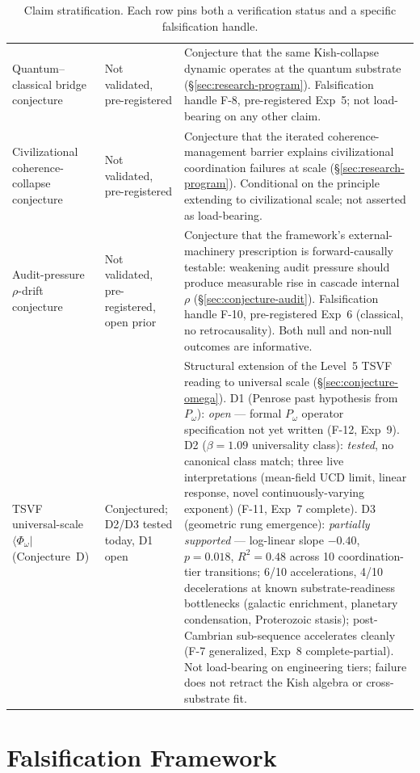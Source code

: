 \documentclass[11pt,a4paper]{article}
\begin{document}
\begin{table}[h]
\begin{tabular}{p{4.5cm}p{3.5cm}p{6.5cm}}
Quantum--classical bridge conjecture & Not validated, pre-registered & Conjecture that the same Kish-collapse dynamic operates at the quantum substrate (\S\ref{sec:research-program}). Falsification handle F-8, pre-registered Exp~5; not load-bearing on any other claim. \\
Civilizational coherence-collapse conjecture & Not validated, pre-registered & Conjecture that the iterated coherence-management barrier explains civilizational coordination failures at scale (\S\ref{sec:research-program}). Conditional on the principle extending to civilizational scale; not asserted as load-bearing. \\
Audit-pressure $\rho$-drift conjecture & Not validated, pre-registered, open prior & Conjecture that the framework's external-machinery prescription is forward-causally testable: weakening audit pressure should produce measurable rise in cascade internal $\rho$ (\S\ref{sec:conjecture-audit}). Falsification handle F-10, pre-registered Exp~6 (classical, no retrocausality). Both null and non-null outcomes are informative. \\
TSVF universal-scale $\langle\Phi_\omega|$ (Conjecture~D) & Conjectured; D2/D3 tested today, D1 open & Structural extension of the Level~5 TSVF reading to universal scale (\S\ref{sec:conjecture-omega}). D1 (Penrose past hypothesis from $P_\omega$): \emph{open} --- formal $P_\omega$ operator specification not yet written (F-12, Exp~9). D2 ($\beta = 1.09$ universality class): \emph{tested}, no canonical class match; three live interpretations (mean-field UCD limit, linear response, novel continuously-varying exponent) (F-11, Exp~7 complete). D3 (geometric rung emergence): \emph{partially supported} — log-linear slope $-0.40$, $p = 0.018$, $R^2 = 0.48$ across 10 coordination-tier transitions; 6/10 accelerations, 4/10 decelerations at known substrate-readiness bottlenecks (galactic enrichment, planetary condensation, Proterozoic stasis); post-Cambrian sub-sequence accelerates cleanly (F-7 generalized, Exp~8 complete-partial). Not load-bearing on engineering tiers; failure does not retract the Kish algebra or cross-substrate fit. \\
\bottomrule
\end{tabular}
\caption{Claim stratification. Each row pins both a verification status and a specific falsification handle.}
\label{tab:stratification}
\end{table}

\section{Falsification Framework}
\label{sec:falsification}
\end{document}
